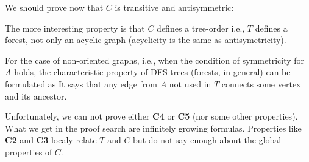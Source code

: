 \documentclass[leqno]{article}
\begin{document}
We should prove now that $C$ is transitive and antisymmetric:

The more interesting property is that $C$ defines a tree-order
 i.e., $T$ defines a forest, not only an acyclic graph
(acyclicity is the same as antisymetricity).

For the case of non-oriented graphs, i.e., when the condition of symmetricity
for $A$
holds, the characteristic property of DFS-trees (forests, in general) can
be formulated as
It says that any edge from $A$ not used in $T$ connects some vertex and its
ancestor. 

Unfortunately, we can not prove either {\bf C4} or {\bf C5} %
(nor some other properties). What we get in the proof search are
infinitely growing formulas. Properties like {\bf C2} and {\bf C3} %
localy relate $T$ and $C$ but do not say enough about the global
properties of $C$.  
\end{document}
